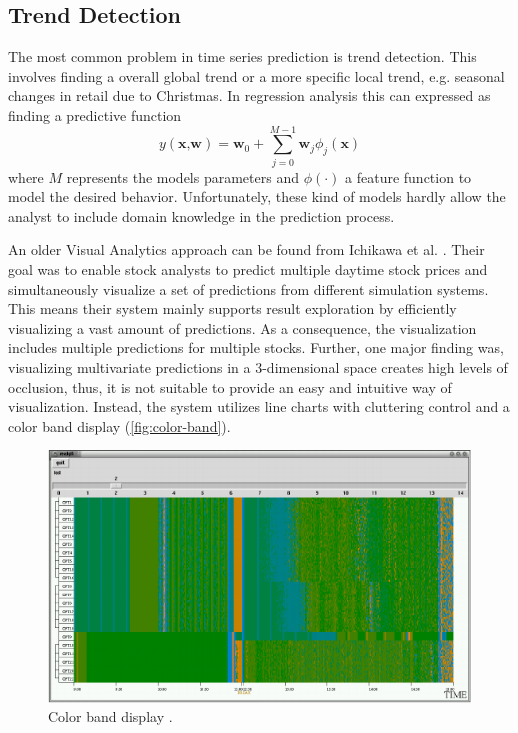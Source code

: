 \documentclass[electronic]{vgtc}             %
\begin{document}
\subsection{Trend Detection\label{subsec:trend}}
The most common problem in time series prediction is trend detection.
This involves finding a overall global trend or a more specific local trend, e.g. seasonal changes in retail due to Christmas.
In regression analysis this can expressed as finding a predictive function 
\[
y(\textbf{x,w}) = \textbf{w}_0 + \sum_{j=0}^{M-1} \textbf{w}_j \phi_j(\textbf{x})
\]
where $M$ represents the models parameters and $\phi(\cdot)$ a feature function to model the desired behavior. 
Unfortunately, these kind of models hardly allow the analyst to include domain knowledge in the prediction process.

An older Visual Analytics approach can be found from Ichikawa et al. \cite{ichikawa:2002}.
Their goal was to enable stock analysts to predict multiple daytime stock prices and simultaneously visualize a set of predictions from different simulation systems. 
This means their system mainly supports result exploration by efficiently visualizing a vast amount of predictions.
As a consequence, the visualization includes multiple predictions for multiple stocks. 
Further, one major finding was, visualizing multivariate predictions in a 3-dimensional space creates high levels of occlusion, thus, it is not suitable to provide an easy and intuitive way of visualization.
Instead, the system utilizes line charts with cluttering control and a color band display (\autoref{fig:color-band}). 

\begin{figure}[htb]
	\centering
	\includegraphics[width=\columnwidth]{color-band}
	\caption{Color band display \cite{ichikawa:2002}.}
	\label{fig:color-band}
\end{figure}
\end{document}
